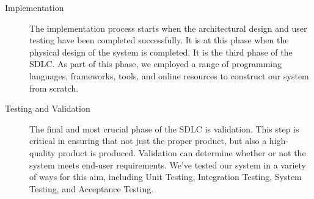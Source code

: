 \begin{description}
\item[Implementation] The implementation process starts when the architectural design and user testing have been completed successfully. It is at this phase when the physical design of the system is completed. It is the third phase of the SDLC. As part of this phase, we employed a range of programming languages, frameworks, tools, and online resources to construct our system from scratch.
\item[Testing and Validation] The final and most crucial phase of the SDLC is validation. This step is critical in ensuring that not just the proper product, but also a high-quality product is produced. Validation can determine whether or not the system meets end-user requirements. We've tested our system in a variety of ways for this aim, including Unit Testing, Integration Testing, System Testing, and Acceptance Testing.
\end{description}

